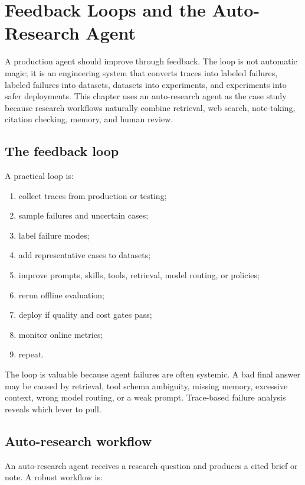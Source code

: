 \chapter{Feedback Loops and the Auto-Research Agent}

A production agent should improve through feedback. The loop is not automatic magic; it is an engineering system that converts traces into labeled failures, labeled failures into datasets, datasets into experiments, and experiments into safer deployments. This chapter uses an auto-research agent as the case study because research workflows naturally combine retrieval, web search, note-taking, citation checking, memory, and human review.

\section{The feedback loop}

A practical loop is:

\begin{enumerate}[leftmargin=*]
  \item collect traces from production or testing;
  \item sample failures and uncertain cases;
  \item label failure modes;
  \item add representative cases to datasets;
  \item improve prompts, skills, tools, retrieval, model routing, or policies;
  \item rerun offline evaluation;
  \item deploy if quality and cost gates pass;
  \item monitor online metrics;
  \item repeat.
\end{enumerate}

The loop is valuable because agent failures are often systemic. A bad final answer may be caused by retrieval, tool schema ambiguity, missing memory, excessive context, wrong model routing, or a weak prompt. Trace-based failure analysis reveals which lever to pull.

\section{Auto-research workflow}

An auto-research agent receives a research question and produces a cited brief or note. A robust workflow is:

